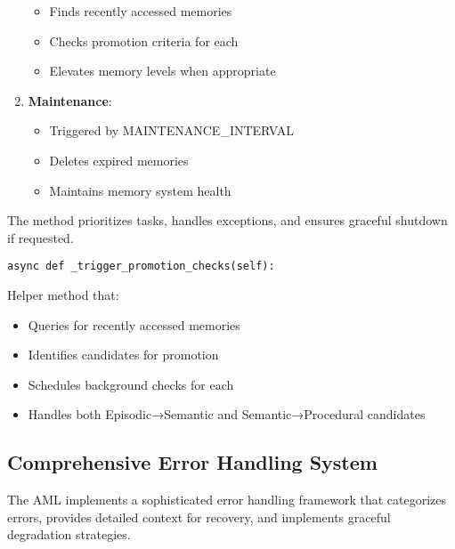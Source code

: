\documentclass[12pt,a4paper]{article}
\begin{document}
\begin{enumerate}[label=\arabic*.]
\begin{itemize}
        \item Finds recently accessed memories
        \item Checks promotion criteria for each
        \item Elevates memory levels when appropriate
    \end{itemize}
    \item \textbf{Maintenance}:
    \begin{itemize}
        \item Triggered by MAINTENANCE\_INTERVAL
        \item Deletes expired memories
        \item Maintains memory system health
    \end{itemize}
\end{enumerate}

The method prioritizes tasks, handles exceptions, and ensures graceful shutdown if requested.
\begin{pageablecode}
\begin{verbatim}
async def _trigger_promotion_checks(self):
\end{verbatim}
\end{pageablecode}
Helper method that:
\begin{itemize}
    \item Queries for recently accessed memories
    \item Identifies candidates for promotion
    \item Schedules background checks for each
    \item Handles both Episodic→Semantic and Semantic→Procedural candidates
\end{itemize}

\subsection*{Comprehensive Error Handling System}

The AML implements a sophisticated error handling framework that categorizes errors, provides detailed context for recovery, and implements graceful degradation strategies.
\end{document}
